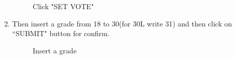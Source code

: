 \documentclass[ManualeUtente]{subfiles}
\begin{document}
\begin{enumerate}
\begin{figure}[H]
		\caption{Click "SET VOTE"}
		\label{fig:Click "SET VOTE"}
	\end{figure}
	\item Then insert a grade from 18 to 30(for 30L write 31) and then click on \textquotedblleft SUBMIT" button for confirm.
	\begin{figure}[H]
		\centering
		\caption{Insert a grade}
		\label{fig:Insert a grade}
	\end{figure}
\end{enumerate}
\end{document}
